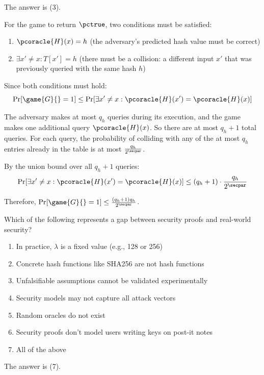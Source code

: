 \ifsolutions
\begin{mysolution}
  The answer is (3).
  
  For the game to return $\pctrue$, two conditions must be satisfied:
  \begin{enumerate}
    \item $\pcoracle{H}(x) = h$ (the adversary's predicted hash value must be correct)
    \item $\exists x' \neq x : T[x'] = h$ (there must be a collision: a different input $x'$ that was previously queried with the same hash $h$)
  \end{enumerate}
  
  Since both conditions must hold:
  \[\Pr[\game{G}{} = 1] \leq \Pr[\exists x' \neq x : \pcoracle{H}(x') = \pcoracle{H}(x)]\]
  
  The adversary makes at most $q_h$ queries during its execution, and the game makes one additional query $\pcoracle{H}(x)$.
  So there are at most $q_h + 1$ total queries.
  For each query, the probability of colliding with any of the at most $q_h$ entries already in the table is at most $\frac{q_h}{2^\secpar}$.
  
  By the union bound over all $q_h + 1$ queries:
  \[
    \Pr[\exists x' \neq x : \pcoracle{H}(x') = \pcoracle{H}(x)] \leq (q_h + 1) \cdot \frac{q_h}{2^\secpar}
  \]
  
  Therefore, $\Pr[\game{G}{} = 1] \leq \frac{(q_h + 1)q_h}{2^\secpar}$.
\end{mysolution}
\fi

\begin{exercise}
  Which of the following represents a gap between security proofs and real-world security?
  \begin{enumerate}
    \item In practice, $\lambda$ is a fixed value (e.g., 128 or 256)
    \item Concrete hash functions like SHA256 are not hash functions
    \item Unfalsifiable assumptions cannot be validated experimentally
    \item Security models may not capture all attack vectors
    \item Random oracles do not exist
    \item Security proofs don't model users writing keys on post-it notes
    \item All of the above
  \end{enumerate}
\end{exercise}

\ifsolutions
\begin{mysolution}
  The answer is (7).
\end{mysolution}
\fi
